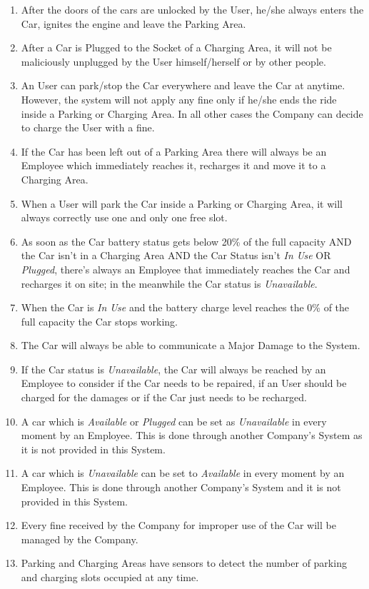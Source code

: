 \begin{enumerate}
	\item After the doors of the cars are unlocked by the User, he/she always enters the Car, ignites the engine and leave the Parking Area.
	\item After a Car is Plugged to the Socket of a Charging Area, it will not be maliciously unplugged by the User himself/herself or by other people.
	\item An User can park/stop the Car everywhere and leave the Car at anytime. However, the system will not apply any fine only if he/she ends the ride inside a Parking or Charging Area. In all other cases the Company can decide to charge the User with a fine.
	\item If the Car has been left out of a Parking Area there will always be an Employee which immediately reaches it, recharges it and move it to a Charging Area. 
	\item When a User will park the Car inside a Parking or Charging Area, it will always correctly use one and only one free slot.		
	\item As soon as the Car battery status gets below 20\% of the full capacity AND the Car isn't in a Charging Area AND the Car Status isn't \textit{In Use} OR \textit{Plugged}, there's always an Employee that immediately reaches the Car and recharges it on site; in the meanwhile the Car status is \textit{Unavailable}.	
	\item When the Car is \textit{In Use} and the battery charge level reaches the 0\% of the full capacity the Car stops working.
	\item The Car will always be able to communicate a Major Damage to the System.
	\item If the Car status is \textit{Unavailable}, the Car will always be reached by an Employee to consider if the Car needs to be repaired, if an User should be charged for the damages or if the Car just needs to be recharged.
	\item A car which is \textit{Available} or \textit{Plugged} can be set as \textit{Unavailable} in every moment by an Employee. This is done through another Company's System as it is not provided in this System.
	\item A car which is \textit{Unavailable} can be set to \textit{Available} in every moment by an Employee. This is done through another Company's System and it is not provided in this System.
	\item Every fine received by the Company for improper use of the Car will be managed by the Company.
	\item Parking and Charging Areas have sensors to detect the number of parking and charging slots occupied at any time.
\end{enumerate}

\clearpage